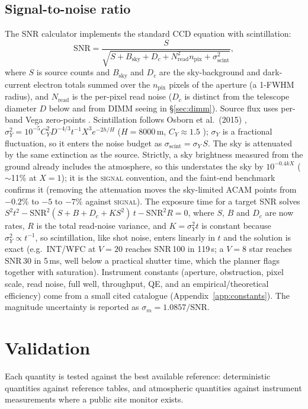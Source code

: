 \documentclass[11pt]{article}
\begin{document}
\subsection{Signal-to-noise ratio}
The SNR calculator implements the standard CCD equation with scintillation:
\[
\mathrm{SNR} = \frac{S}{\sqrt{S + B_{\mathrm{sky}} + D_c + N_{\mathrm{read}}^2 n_{\mathrm{pix}} + \sigma_{\mathrm{scint}}^2}},
\]
where $S$ is source counts and $B_{\mathrm{sky}}$ and $D_c$ are the sky-background
and dark-current electron totals summed over the $n_{\mathrm{pix}}$ pixels of the
aperture (a 1-FWHM radius), and $N_{\mathrm{read}}$ is the per-pixel read noise
($D_c$ is distinct from the telescope diameter $D$ below and from DIMM seeing in
\S\ref{sec:dimm}). Source flux uses per-band Vega zero-points \cite{bessell}.
Scintillation follows Osborn et al.\ (2015) \cite{osborn},
$\sigma_Y^2 = 10^{-5}C_Y^2 D^{-4/3}t^{-1}X^3 e^{-2h/H}$ ($H=8000$\,m, $C_Y\approx1.5$
\cite{kornilov}); $\sigma_Y$ is a fractional fluctuation, so it enters the noise
budget as $\sigma_{\text{scint}} = \sigma_Y\,S$. The sky is attenuated by the same
extinction as the source. Strictly, a sky brightness measured from the ground already
includes the atmosphere, so this understates the sky by $10^{-0.4kX}$ ($\sim$11\% at
$X=1$); it is the \textsc{signal} convention, and the faint-end benchmark confirms it
(removing the attenuation moves the sky-limited ACAM points from $-0.2\%$ to $-5$ to
$-7\%$ against \textsc{signal}). The exposure time for a target SNR solves
$S^2t^2 - \mathrm{SNR}^2(S+B+D_c+KS^2)\,t - \mathrm{SNR}^2 R = 0$, where $S$, $B$ and
$D_c$ are now rates, $R$ is the total read-noise variance, and $K=\sigma_Y^2t$ is
constant because $\sigma_Y^2\propto t^{-1}$, so scintillation, like shot noise, enters
linearly in $t$ and the solution is exact (e.g.\ INT/WFC at $V=20$ reaches SNR\,100 in
119\,s; a $V=8$ star reaches SNR\,30 in 5\,ms, well below a practical shutter time,
which the planner flags together with saturation). Instrument constants (aperture,
obstruction, pixel scale, read noise, full well, throughput, QE, and an
empirical/theoretical efficiency) come from a small cited catalogue
(Appendix~\ref{app:constants}). The magnitude uncertainty is reported as
$\sigma_m = 1.0857/\mathrm{SNR}$.

\section{Validation}

Each quantity is tested against the best available reference: deterministic
quantities against reference tables, and atmospheric quantities against instrument
measurements where a public site monitor exists.
\end{document}
